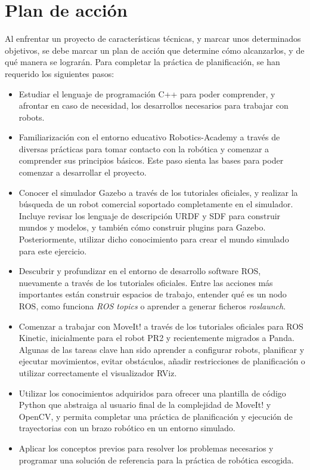 \documentclass[12pt,spanish,chapterprefix, numbers=noenddot]{book}
\numberwithin{equation}{section}
\numberwithin{figure}{section}
\begin{document}
\section{Plan de acción}
Al enfrentar un proyecto de características técnicas, y marcar unos determinados objetivos, se debe marcar un plan de acción que determine cómo alcanzarlos, y de qué manera se lograrán. Para completar la práctica de planificación, se han requerido los siguientes pasos: 
\begin{itemize}
    \item Estudiar el lenguaje de programación C++ para poder comprender, y afrontar en caso de necesidad, los desarrollos necesarios para trabajar con robots.
    \item Familiarización con el entorno educativo Robotics-Academy a través de diversas prácticas para tomar contacto con la robótica y comenzar a comprender sus principios básicos. Este paso sienta las bases para poder comenzar a desarrollar el proyecto. 
    \item Conocer el simulador Gazebo a través de los tutoriales oficiales, y realizar la búsqueda de un robot comercial soportado completamente en el simulador. Incluye revisar los lenguaje de descripción URDF y SDF para construir mundos y modelos, y también cómo construir plugins para Gazebo. Posteriormente, utilizar dicho conocimiento para crear el mundo simulado para este ejercicio. 
    \item Descubrir y profundizar en el entorno de desarrollo software ROS, nuevamente a través de los tutoriales oficiales. Entre las acciones más importantes están construir espacios de trabajo, entender qué es un nodo ROS, como funciona \textit{ROS topics} o aprender a generar ficheros \textit{roslaunch}.
    \item Comenzar a trabajar con MoveIt! a través de los tutoriales oficiales para ROS Kinetic, inicialmente para el robot PR2 y recientemente migrados a Panda. Algunas de las tareas clave han sido aprender a configurar robots, planificar y ejecutar movimientos, evitar obstáculos, añadir restricciones de planificación o utilizar correctamente el visualizador RViz. 
    \item Utilizar los conocimientos adquiridos para ofrecer una plantilla de código Python que abstraiga al usuario final de la complejidad de MoveIt! y OpenCV, y permita completar una práctica de planificación y ejecución de trayectorias con un brazo robótico en un entorno simulado. 
    \item Aplicar los conceptos previos para resolver los problemas necesarios y programar una solución de referencia para la práctica de robótica escogida.
    
\end{itemize}
\end{document}
